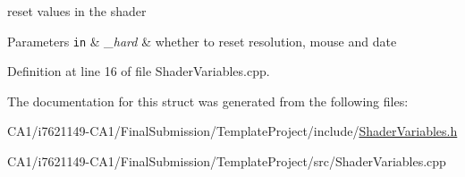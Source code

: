 reset values in the shader 


\begin{DoxyParams}[1]{Parameters}
\mbox{\tt in}  & {\em \-\_\-hard} & whether to reset resolution, mouse and date \\
\hline
\end{DoxyParams}


Definition at line 16 of file Shader\-Variables.\-cpp.



The documentation for this struct was generated from the following files\-:\begin{DoxyCompactItemize}
\item 
C\-A1/i7621149-\/\-C\-A1/\-Final\-Submission/\-Template\-Project/include/\hyperlink{_shader_variables_8h}{Shader\-Variables.\-h}\item 
C\-A1/i7621149-\/\-C\-A1/\-Final\-Submission/\-Template\-Project/src/Shader\-Variables.\-cpp\end{DoxyCompactItemize}
